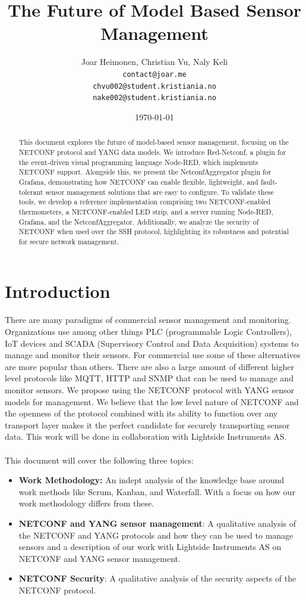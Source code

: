 \documentclass[12pt]{article}
\author{
    Joar Heimonen, Christian Vu, Naly Keli \\
    \texttt{contact@joar.me}\\ 
    \texttt{chvu002@student.kristiania.no}\\
    \texttt{nake002@student.kristiania.no}
}
\title{
  \textbf{The Future of Model Based Sensor Management}\\
}
\date{\today}
\begin{document}

\maketitle

\begin{abstract}
  This document explores the future of model-based sensor management, focusing on the NETCONF protocol and YANG data models. We introduce Red-Netconf,
  a plugin for the event-driven visual programming language Node-RED, which implements NETCONF support. Alongside this, we present the NetconfAggregator 
  plugin for Grafana, demonstrating how NETCONF can enable flexible, lightweight, and fault-tolerant sensor management solutions that are easy to configure.
  To validate these tools, we develop a reference implementation comprising two NETCONF-enabled thermometers, a NETCONF-enabled LED strip, and a server 
  running Node-RED, Grafana, and the NetconfAggregator. Additionally, we analyze the security of NETCONF when used over the SSH protocol, 
  highlighting its robustness and potential for secure network management.
\end{abstract}

\pagebreak

\tableofcontents

\pagebreak


\section{Introduction}
There are many paradigms of commercial sensor management and monitoring. Organizations use among other things
PLC (programmable Logic Controllers), IoT devices and SCADA (Supervisory Control and Data Acquisition) systems to 
manage and monitor their sensors. For commercial use 
some of these alternatives are more popular than others. There are also a large amount of different higher level protocols
like MQTT, HTTP and SNMP that can be used to manage and monitor sensors. We propose using the NETCONF protocol 
with YANG sensor models for management. We believe that the low level nature of NETCONF and the openness of the protocol combined with 
its ability to function over any transport layer makes it the perfect candidate for securely transporting sensor data.
This work will be done in collaboration with Lightside Instruments AS.
\\
\\
This document will cover the following three topics:
\begin{itemize}
  \item \textbf{Work Methodology:} An indept analysis of the knowledge base around work methods like Scrum, Kanban, and Waterfall. 
  With a focus on how our work methodology differs from these.
  \item \textbf{NETCONF and YANG sensor management}: A qualitative analysis of the NETCONF and YANG protocols and how they can be used to manage sensors and 
  a description of our work with Lightside Instruments AS on NETCONF and YANG sensor management.
  \item \textbf{NETCONF Security}: A qualitative analysis of the security aspects of the NETCONF protocol.
\end{itemize}
\end{document}
